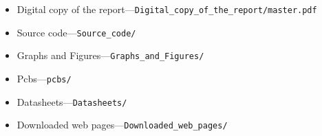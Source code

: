 \label{sec:appendix_cd}
\begin{itemize}
\item Digital copy of the report---\texttt{Digital\_copy\_of\_the\_report/master.pdf}
\item Source code---\texttt{Source\_code/}  
\item Graphs and Figures---\texttt{Graphs\_and\_Figures/} 
\item Pcbs---\texttt{pcbs/} 
\item Datasheets---\texttt{Datasheets/}
\item Downloaded web pages---\texttt{Downloaded\_web\_pages/}
\end{itemize}
